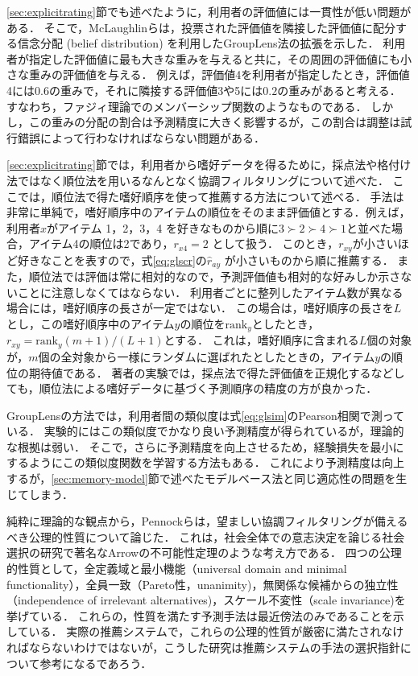 \ref{sec:explicitrating}節でも述べたように，利用者の評価値には一貫性が低い問題がある．
そこで，McLaughlinら\cite{sigir:04:01}は，投票された評価値を隣接した評価値に配分する信念分配 (belief distribution) を利用したGroupLens法の拡張を示した．
利用者が指定した評価値に最も大きな重みを与えると共に，その周囲の評価値にも小さな重みの評価値を与える．
例えば，評価値4を利用者が指定したとき，評価値4には$0.6$の重みで，それに隣接する評価値3や5には$0.2$の重みがあると考える．
すなわち，ファジィ理論でのメンバーシップ関数のようなものである．
しかし，この重みの分配の割合は予測精度に大きく影響するが，この割合は調整は試行錯誤によって行わなければならない問題がある．

\ref{sec:explicitrating}節では，利用者から嗜好データを得るために，採点法や格付け法ではなく順位法を用いるなんとなく協調フィルタリング\cite{epublist:039}について述べた．
ここでは，順位法で得た嗜好順序を使って推薦する方法について述べる．
手法は非常に単純で，嗜好順序中のアイテムの順位をそのまま評価値とする．例えば，利用者$x$がアイテム 1，2，3，4 を好きなものから順に$3{\succ}2{\succ}4{\succ}1$と並べた場合，アイテム4の順位は2であり，$r_{x4}=2$ として扱う．
このとき，$r_{xy}$が小さいほど好きなことを表すので，式\eqref{eq:glscr}の$\hat{r}_{ay}$ が小さいものから順に推薦する．
また，順位法では評価は常に相対的なので，予測評価値も相対的な好みしか示さないことに注意しなくてはならない．
利用者ごとに整列したアイテム数が異なる場合には，嗜好順序の長さが一定ではない．
この場合は，嗜好順序の長さを$L$とし，この嗜好順序中のアイテム$y$の順位を$\mathrm{rank}_y$としたとき，$r_{xy}=\mathrm{rank}_y(m+1)/(L+1)$とする．
これは，嗜好順序に含まれる$L$個の対象が，$m$個の全対象から一様にランダムに選ばれたとしたときの，アイテム$y$の順位の期待値である．
著者の実験\cite{epublist:064}では，採点法で得た評価値を正規化するなどしても，順位法による嗜好データに基づく予測順序の精度の方が良かった．

GroupLensの方法では，利用者間の類似度は式\eqref{eq:glsim}のPearson相関で測っている．
実験的にはこの類似度でかなり良い予測精度が得られているが，理論的な根拠は弱い．
そこで，さらに予測精度を向上させるため，経験損失を最小にするようにこの類似度関数を学習する方法\cite{kdd:07:01}もある．
これにより予測精度は向上するが，\ref{sec:memory-model}節で述べたモデルベース法と同じ適応性の問題を生じてしまう．

純粋に理論的な観点から，Pennockら\cite{aaai:00:02}は，望ましい協調フィルタリングが備えるべき公理的性質について論じた．
これは，社会全体での意志決定を論じる社会選択の研究で著名なArrowの不可能性定理\cite{eb:040:00}のような考え方である．
四つの公理的性質として，全定義域と最小機能（universal domain and minimal functionality），全員一致（Pareto性，unanimity)，無関係な候補からの独立性（independence of irrelevant alternatives)，スケール不変性（scale invariance)を挙げている．
これらの，性質を満たす予測手法は最近傍法のみであることを示している．
実際の推薦システムで，これらの公理的性質が厳密に満たされなければならないわけではないが，こうした研究は推薦システムの手法の選択指針について参考になるであろう．

